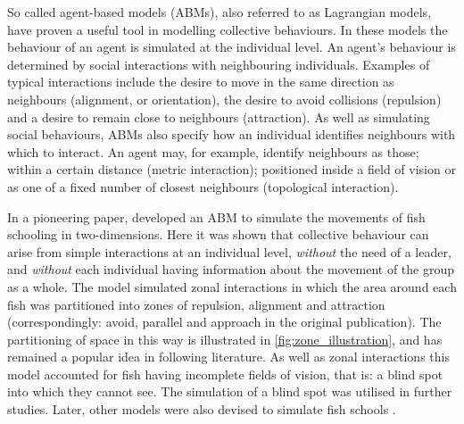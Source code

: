So called agent-based models (ABMs), also referred to as Lagrangian models,
have proven a useful tool in modelling collective behaviours. In these models
the behaviour of an agent is simulated at the individual level. An agent's
behaviour is determined by social interactions with neighbouring individuals.
Examples of typical interactions include the desire to move in the same
direction as neighbours (alignment, or orientation), the desire to avoid
collisions (repulsion) and a desire to remain close to neighbours (attraction).
As well as simulating social behaviours, ABMs also specify how an individual
identifies neighbours with which to interact. An agent may, for example,
identify neighbours as those; within a certain distance (metric interaction);
positioned inside a field of vision or as one of a fixed number of closest
neighbours (topological interaction).

In a pioneering paper, \textcite{aoki82} developed an ABM to simulate the
movements of fish schooling in two-dimensions. Here it was shown that
collective behaviour can arise from simple interactions at an individual level,
\emph{without} the need of a leader, and \emph{without} each individual having
information about the movement of the group as a whole. The model simulated
zonal interactions in which the area around each fish was partitioned into
zones of repulsion, alignment and attraction (correspondingly: avoid, parallel
and approach in the original publication). The partitioning of space in this
way is illustrated in \cref{fig:zone_illustration}, and has remained a popular
idea in following literature. As well as zonal interactions this model
accounted for fish having incomplete fields of vision, that is: a blind spot
into which they cannot see. The simulation of a blind spot was utilised in
further studies. Later, other models were also devised to simulate fish schools
\parencite{okubo86, huth92}.

